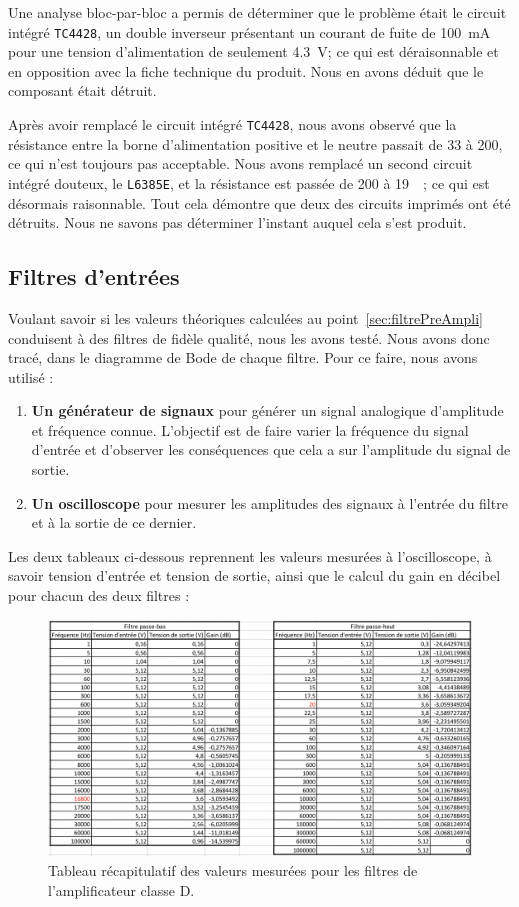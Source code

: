 \documentclass[10pt, oneside, a4paper]{article}
\begin{document}
Une analyse bloc-par-bloc a permis de déterminer que le problème était le circuit intégré \verb|TC4428|, un double inverseur présentant un courant de fuite de \SI{100}{\milli\ampere} pour une tension d'alimentation de seulement \SI{4.3}{\volt};
ce qui est déraisonnable et en opposition avec la fiche technique du produit.
Nous en avons déduit que le composant était détruit.

Après avoir remplacé le circuit intégré \verb|TC4428|, nous avons observé que la résistance entre la borne d'alimentation positive et le neutre passait de \SI{33}{\Omega} à \SI{200}{\Omega}, ce qui n'est toujours pas acceptable.
Nous avons remplacé un second circuit intégré douteux, le \verb|L6385E|, et la résistance est passée de \SI{200}{\Omega} à \SI{19}{\kilo\Omega}; ce qui est désormais raisonnable.
Tout cela démontre que deux des circuits imprimés ont été détruits.
Nous ne savons pas déterminer l'instant auquel cela s'est produit.

\subsection{Filtres d'entrées}
Voulant savoir si les valeurs théoriques calculées au point~\ref{sec:filtrePreAmpli}
conduisent à des filtres de fidèle qualité, nous les avons testé.
Nous avons donc tracé, dans le diagramme de Bode de chaque filtre.
Pour ce faire, nous avons utilisé :
\begin{enumerate}
    \item\textbf{Un générateur de signaux} pour générer un signal analogique
        d'amplitude et fréquence connue.
        L'objectif est de faire varier la fréquence du signal d'entrée et d'observer les
        conséquences que cela a sur l'amplitude du signal de sortie.
    \item\textbf{Un oscilloscope} pour mesurer les amplitudes des signaux à l'entrée du
        filtre et à la sortie de ce dernier.
\end{enumerate}

Les deux tableaux ci-dessous reprennent les valeurs mesurées à l'oscilloscope, à savoir tension d'entrée et tension de sortie, ainsi que le calcul du gain en décibel pour chacun des deux filtres :
\begin{figure}[!ht]
    \centering
    \includegraphics[scale=0.57]{image/resultat-filtres.jpg}
    \caption{Tableau récapitulatif des valeurs mesurées pour les filtres de l'amplificateur classe D.}
\end{figure}
\end{document}
